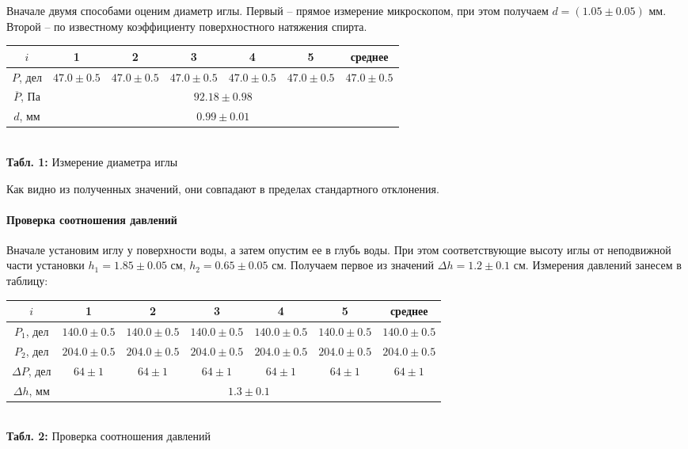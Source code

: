 \documentclass[12pt,a4paper]{scrartcl}
\begin{document}
	Вначале двумя способами оценим диаметр иглы. Первый -- прямое измерение микроскопом, при этом получаем $d = (1.05 \pm 0.05)$ мм. Второй -- по известному коэффициенту поверхностного натяжения спирта.

	\begin{center}
		\begin{tabular}{|c|c|c|c|c|c|c|}
			\hline
			$i$ & 1 & 2 & 3 & 4 & 5 & среднее
			\\\hline
			$P$, дел & $47.0 \pm 0.5$ & $47.0 \pm 0.5$ & $47.0 \pm 0.5$ & $47.0 \pm 0.5$ & $47.0 \pm 0.5$ & $47.0 \pm 0.5$
			\\\hline
			$\overline{P}$, Па & \multicolumn{6}{|c|}{$92.18 \pm 0.98$}
			\\\hline
			$d$, мм & \multicolumn{6}{|c|}{$0.99 \pm 0.01$}
			\\\hline
		\end{tabular}
		\\\textbf{Табл. 1:} Измерение диаметра иглы
	\end{center}

	Как видно из полученных значений, они совпадают в пределах стандартного отклонения.

	\paragraph{Проверка соотношения давлений} \hfill

	Вначале установим иглу у поверхности воды, а затем опустим ее в глубь воды. При этом соответствующие высоту иглы от неподвижной части установки $h_1 = 1.85 \pm 0.05$ см, $h_2 = 0.65 \pm 0.05$ см. Получаем первое из значений $\Delta h = 1.2 \pm 0.1$ см. Измерения давлений занесем в таблицу:
	
	\begin{center}
		\begin{tabular}{|c|c|c|c|c|c|c|}
			\hline
			$i$ & 1 & 2 & 3 & 4 & 5 & среднее
			\\\hline
			$P_1$, дел & $140.0 \pm 0.5$ & $140.0 \pm 0.5$ & $140.0 \pm 0.5$ & $140.0 \pm 0.5$ & $140.0 \pm 0.5$ & $140.0 \pm 0.5$
			\\\hline
			$P_2$, дел & $204.0 \pm 0.5$ & $204.0 \pm 0.5$ & $204.0 \pm 0.5$ & $204.0 \pm 0.5$ & $204.0 \pm 0.5$ & $204.0 \pm 0.5$
			\\\hline
			$\Delta P$, дел & $64 \pm 1$ & $64 \pm 1$ & $64 \pm 1$ & $64 \pm 1$ & $64 \pm 1$ & $64 \pm 1$
			\\\hline
			$\Delta h$, мм & \multicolumn{6}{|c|}{$1.3 \pm 0.1$}
			\\\hline
		\end{tabular}
		\\\textbf{Табл. 2:} Проверка соотношения давлений
	\end{center}
\end{document}

